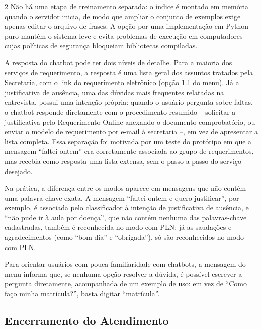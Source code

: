 \documentclass[10pt]{article}
\begin{document}
\begin{multicols}{2}
Não há uma etapa de treinamento separada: o índice é montado em memória
quando o servidor inicia, de modo que ampliar o conjunto de exemplos exige
apenas editar o arquivo de frases. A opção por uma implementação em Python
puro mantém o sistema leve e evita problemas de execução em computadores
cujas políticas de segurança bloqueiam bibliotecas compiladas.

A resposta do chatbot pode ter dois níveis de detalhe. Para a maioria dos
serviços de requerimento, a resposta é uma lista geral dos assuntos
tratados pela Secretaria, com o link do requerimento eletrônico (opção 1.1
do menu). Já a justificativa de ausência, uma das dúvidas mais frequentes
relatadas na entrevista, possui uma intenção própria: quando o usuário
pergunta sobre faltas, o chatbot responde diretamente com o procedimento
resumido -- solicitar a justificativa pelo Requerimento Online anexando o
documento comprobatório, ou enviar o modelo de requerimento por e-mail à
secretaria --, em vez de apresentar a lista completa. Essa separação foi
motivada por um teste do protótipo em que a mensagem ``faltei ontem'' era
corretamente associada ao grupo de requerimentos, mas recebia como
resposta uma lista extensa, sem o passo a passo do serviço desejado.

Na prática, a diferença entre os modos aparece em mensagens que não contêm
uma palavra-chave exata. A mensagem ``faltei ontem e quero justificar'', por
exemplo, é associada pelo classificador à intenção de justificativa de
ausência, e ``não pude ir à aula por doença'', que não contém nenhuma das
palavras-chave cadastradas, também é reconhecida no modo com PLN; já as saudações e agradecimentos (como ``bom dia'' e ``obrigada''), só são
reconhecidos no modo com PLN.

Para orientar usuários com pouca familiaridade com chatbots, a mensagem do
menu informa que, se nenhuma opção resolver a dúvida, é possível escrever
a pergunta diretamente, acompanhada de um exemplo de uso: em vez de ``Como
faço minha matrícula?'', basta digitar ``matrícula''.

\subsection{Encerramento do Atendimento}


\end{multicols}
\end{document}
